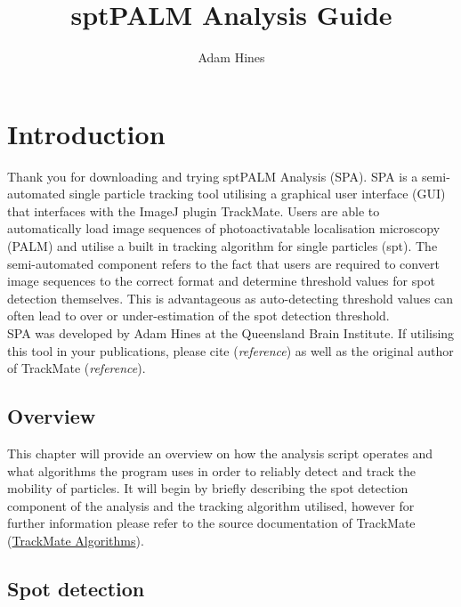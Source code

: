 \documentclass[11pt]{article} %
\title{sptPALM Analysis Guide}
\author{Adam Hines}
\date{}
\begin{document}
\begin{center}{}
\end{center}

\newpage
\tableofcontents

\newpage

\section{Introduction}

Thank you for downloading and trying sptPALM Analysis (SPA). SPA is a semi-automated single particle tracking tool utilising a graphical user interface (GUI) that interfaces with the ImageJ plugin TrackMate. Users are able to automatically load image sequences of photoactivatable localisation microscopy (PALM) and utilise a built in tracking algorithm for single particles (spt). The semi-automated component refers to the fact that users are required to convert image sequences to the correct format and determine threshold values for spot detection themselves. This is advantageous as auto-detecting threshold values can often lead to over or under-estimation of the spot detection threshold. \\
SPA was developed by Adam Hines at the Queensland Brain Institute. If utilising this tool in your publications, please cite (\textit{reference}) as well as the original author of TrackMate (\textit{reference}).

\subsection{Overview}

This chapter will provide an overview on how the analysis script operates and what algorithms the program uses in order to reliably detect and track the mobility of particles. It will begin by briefly describing the spot detection component of the analysis and the tracking algorithm utilised, however for further information please refer to the source documentation of TrackMate (\href{https://imagej.net/TrackMate_Algorithms}{TrackMate Algorithms}).

\subsection{Spot detection}
\end{document}
